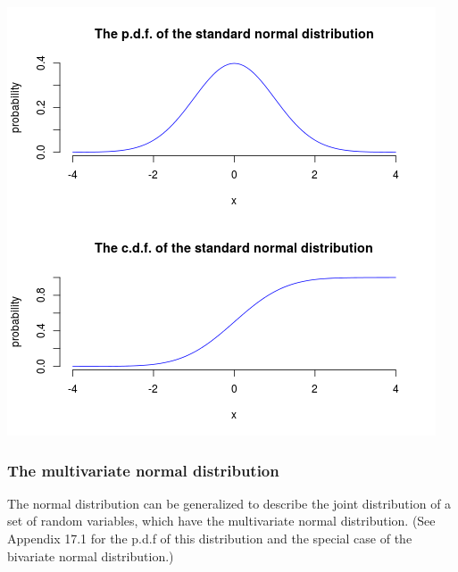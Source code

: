 \documentclass[a4paper,11pt]{article}
\begin{document}
\begin{center}
\includegraphics[width=.9\linewidth]{figure/norm1.png}
\end{center}

\subsubsection*{The multivariate normal distribution}
\label{sec:orga62a12b}
The normal distribution can be generalized to describe the joint
distribution of a set of random variables, which have the multivariate
normal distribution. (See Appendix 17.1 for the p.d.f of this
distribution and the special case of the bivariate normal
distribution.)
\end{document}
